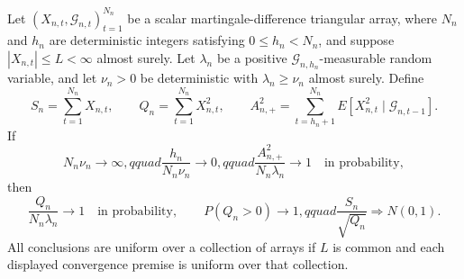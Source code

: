 Let \((X_{n,t},\mathcal G_{n,t})_{t=1}^{N_n}\) be a scalar martingale-difference triangular array, where \(N_n\) and \(h_n\) are deterministic integers satisfying \(0\le h_n<N_n\), and suppose \(|X_{n,t}|\le L<\infty\) almost surely. Let \(\lambda_n\) be a positive \(\mathcal G_{n,h_n}\)-measurable random variable, and let \(\nu_n>0\) be deterministic with \(\lambda_n\ge\nu_n\) almost surely. Define
\[
 S_n=\sum_{t=1}^{N_n}X_{n,t},\qquad
 Q_n=\sum_{t=1}^{N_n}X_{n,t}^2,\qquad
 A_{n,+}^2=\sum_{t=h_n+1}^{N_n}E[X_{n,t}^2\mid\mathcal G_{n,t-1}].
\]
If
\[
 N_n\nu_n\longrightarrow\infty,qquad
 \frac{h_n}{N_n\nu_n}\longrightarrow0,qquad
 \frac{A_{n,+}^2}{N_n\lambda_n}\longrightarrow1
 \quad\text{in probability},
\]
then
\[
 \frac{Q_n}{N_n\lambda_n}\longrightarrow1
 \quad\text{in probability},\qquad
 P(Q_n>0)\longrightarrow1,qquad
 \frac{S_n}{\sqrt{Q_n}}\Rightarrow N(0,1).
\]
All conclusions are uniform over a collection of arrays if \(L\) is common and each displayed convergence premise is uniform over that collection.
